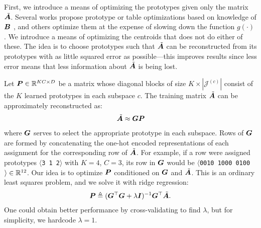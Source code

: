 First, we introduce a means of optimizing the prototypes given only the matrix $\tilde{\bm{A}}$. Several works propose prototype or table optimizations based on knowledge of $\bm{B}$ \cite{pairq,optimizedDists}, and others optimize them at the expense of slowing down the function $g(\cdot)$ \cite{cq,scq}. We introduce a means of optimizing the centroids that does not do either of these. The idea is to choose prototypes such that $\tilde{\bm{A}}$ can be reconstructed from its prototypes with as little squared error as possible---this improves results since less error means that less information about $\tilde{\bm{A}}$ is being lost.

Let $\bm{P} \in \mathbb{R}^{KC \times D}$ be a matrix whose diagonal blocks of size $K \times |\mathcal{J}^{(c)}|$ consist of the $K$ learned prototypes in each subspace $c$. The training matrix $\tilde{\bm{A}}$ can be approximately reconstructed as:
\begin{align}
    \tilde{\bm{A}} \approx \bm{G}\bm{P}
\end{align}
where $\bm{G}$ serves to select the appropriate prototype in each subspace. Rows of $\bm{G}$ are formed by concatenating the one-hot encoded representations of each assignment for the corresponding row of $\tilde{\bm{A}}$. For example, if a row were assigned prototypes $\langle$\texttt{3 1 2}$\rangle$ with $K = 4$, $C = 3$, its row in $\bm{G}$ would be $\langle$\texttt{0010 1000 0100}$\rangle \in \mathbb{R}^{12}$. Our idea is to optimize $\bm{P}$ conditioned on $\bm{G}$ and $\tilde{\bm{A}}$. This is an ordinary least squares problem, and we solve it with ridge regression:
\begin{align}
\vspace*{-1mm}
    \mat{P} \triangleq (\mat{G}^\top \mat{G} + \lambda \mat{I})^{-1} \mat{G}^\top \tilde{\A}.
\end{align}
One could obtain better performance by cross-validating to find $\lambda$, but for simplicity, we hardcode $\lambda = 1$. %

